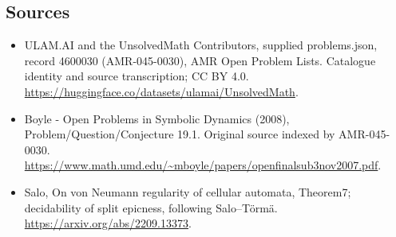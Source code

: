 \documentclass[11pt,a4paper]{article}
\begin{document}
\subsection{Sources}
\begin{itemize}
\item[S1] ULAM.AI and the UnsolvedMath Contributors, supplied problems.json, record 4600030 (AMR-045-0030), AMR Open Problem Lists. Catalogue identity and source transcription; CC BY 4.0.
\url{https://huggingface.co/datasets/ulamai/UnsolvedMath}.
\item[S2] Boyle - Open Problems in Symbolic Dynamics (2008), Problem/Question/Conjecture 19.1. Original source indexed by AMR-045-0030.
\url{https://www.math.umd.edu/~mboyle/papers/openfinalsub3nov2007.pdf}.
\item[S3] Salo, On von Neumann regularity of cellular automata, Theorem7; decidability of split epicness, following Salo–Törmä.
\url{https://arxiv.org/abs/2209.13373}.
\end{itemize}
\end{document}
